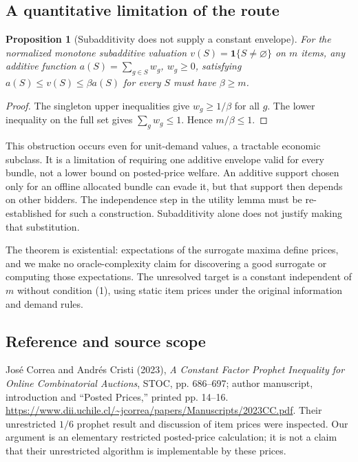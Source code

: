 \documentclass[11pt,a4paper]{article}
\newtheorem{proposition}[theorem]{Proposition}
\newcommand{\ind}{\mathbf 1}
\begin{document}
\subsection*{A quantitative limitation of the route}
\begin{proposition}[Subadditivity does not supply a constant envelope]
For the normalized monotone subadditive valuation $v(S)=\ind\{S\ne\varnothing\}$ on $m$ items, any additive function $a(S)=\sum_{g\in S}w_g$, $w_g\geq0$, satisfying $a(S)\leq v(S)\leq\beta a(S)$ for every $S$ must have $\beta\geq m$.
\end{proposition}
\begin{proof}
The singleton upper inequalities give $w_g\geq1/\beta$ for all $g$. The lower inequality on the full set gives $\sum_gw_g\leq1$. Hence $m/\beta\leq1$.
\end{proof}
This obstruction occurs even for unit-demand values, a tractable economic subclass. It is a limitation of requiring one additive envelope valid for every bundle, not a lower bound on posted-price welfare. An additive support chosen only for an offline allocated bundle can evade it, but that support then depends on other bidders. The independence step in the utility lemma must be re-established for such a construction. Subadditivity alone does not justify making that substitution.

The theorem is existential: expectations of the surrogate maxima define prices, and we make no oracle-complexity claim for discovering a good surrogate or computing those expectations. The unresolved target is a constant independent of $m$ without condition (1), using static item prices under the original information and demand rules.

\subsection*{Reference and source scope}
Jos\'e Correa and Andr\'es Cristi (2023), \emph{A Constant Factor Prophet Inequality for Online Combinatorial Auctions}, STOC, pp. 686--697; author manuscript, introduction and ``Posted Prices,'' printed pp. 14--16. \url{https://www.dii.uchile.cl/~jcorrea/papers/Manuscripts/2023CC.pdf}. Their unrestricted $1/6$ prophet result and discussion of item prices were inspected. Our argument is an elementary restricted posted-price calculation; it is not a claim that their unrestricted algorithm is implementable by these prices.
\end{document}
